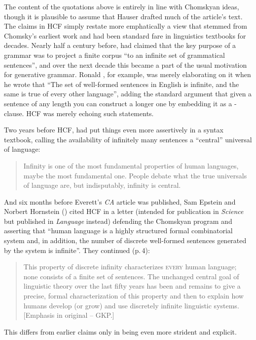 \documentclass[output=paper,colorlinks,citecolor=brown
]{langscibook}
\begin{document}
The content of the quotations above is entirely in line with Chomskyan
ideas, though it is plausible to assume that Hauser drafted much of the
article's text. The claims in HCF simply restate more emphatically a
view that stemmed from Chomsky's earliest work and had been standard
fare in linguistics textbooks for decades. Nearly half a century before,
\citet[113]{Chomsky56} had claimed that the key purpose
of a grammar was to project a finite corpus ``to an infinite set of
grammatical sentences'', and over the next decade this became a part
of the usual motivation for generative grammar. Ronald \citet[31]{Langacker68}, for example, was merely elaborating on
it when he wrote that ``The set of well-formed sentences in English
is infinite, and the same is true of every other language'', adding
the standard argument that given a sentence of any length you can
construct a longer one by embedding it as a -clause.
HCF was merely echoing such statements.

Two years before HCF, \citet[3]{Lasnik00} had put things
even more assertively in a syntax textbook, calling the availability
of infinitely many sentences a ``central'' universal of language:
\begin{quote}
Infinity is one of the most fundamental properties of human languages,
maybe the most fundamental one. People debate what the true universals
of language are, but indisputably, infinity is central.
\end{quote}
And six months before Everett's \textit{CA} article was published,
Sam Epstein and Norbert Hornstein (\citeyear{EpstHorn05}) cited HCF in
a letter (intended for publication in \textit{Science} but published
in \textit{Language} instead) defending the Chomskyan program and asserting
that ``human language is a highly structured formal combinatorial system
and, in addition, the number of discrete well-formed sentences generated
by the system is infinite''. They continued (p.\,4):
\begin{quote}
\sloppy
This property of discrete infinity characterizes \mbox{\textsc{every}}
human language; none consists of a finite set of sentences. The unchanged
central goal of linguistic theory over the last fifty years has been and
remains to give a precise, formal characterization of this property and
then to explain how humans develop (or grow) and use discretely infinite
linguistic systems. [Emphasis in original -- GKP.]
\end{quote}
This differs from earlier claims only in being even more strident and
explicit.
\end{document}

